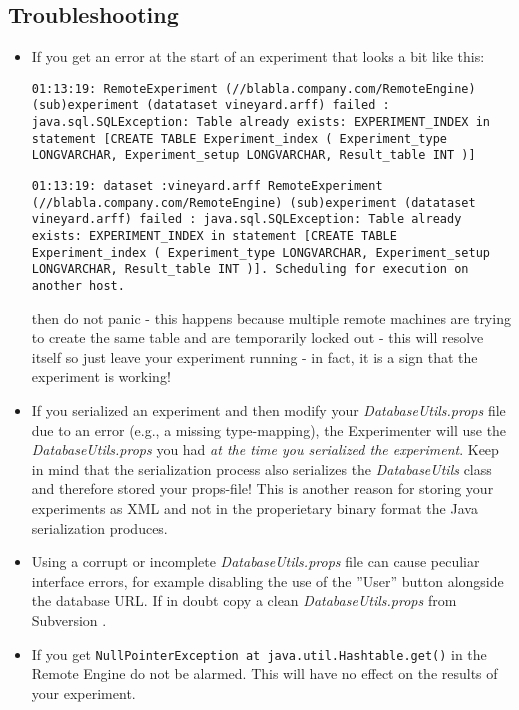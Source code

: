 \subsection{Troubleshooting}

\begin{itemize}
   \item If you get an error at the start of an experiment that looks a bit like this: 

    \texttt{01:13:19: RemoteExperiment (//blabla.company.com/RemoteEngine) (sub)experiment (datataset vineyard.arff) failed : \\ java.sql.SQLException: Table already exists: EXPERIMENT\_INDEX in statement [CREATE TABLE Experiment\_index ( Experiment\_type \\ LONGVARCHAR, Experiment\_setup LONGVARCHAR, Result\_table INT )]} 

    \texttt{01:13:19: dataset :vineyard.arff RemoteExperiment \\ (//blabla.company.com/RemoteEngine) (sub)experiment (datataset vineyard.arff) failed : java.sql.SQLException: Table already exists: EXPERIMENT\_INDEX in statement [CREATE TABLE \\ Experiment\_index ( Experiment\_type LONGVARCHAR, Experiment\_setup LONGVARCHAR, Result\_table INT )]. Scheduling for execution on \\ another host.} 

    then do not panic - this happens because multiple remote machines are trying to create the same table and are temporarily locked out - this will resolve itself so just leave your experiment running - in fact, it is a sign that the experiment is working! 

   \item If you serialized an experiment and then modify your \textit{DatabaseUtils.props} file due to an error (e.g., a missing type-mapping), the Experimenter will use the \textit{DatabaseUtils.props} you had \textit{at the time you serialized the experiment}. Keep in mind that the serialization process also serializes the \textit{DatabaseUtils} class and therefore stored your props-file! This is another reason for storing your experiments as XML and not in the properietary binary format the Java serialization produces. 

   \item Using a corrupt or incomplete \textit{DatabaseUtils.props} file can cause peculiar interface errors, for example disabling the use of the ''User'' button alongside the database URL. If in doubt copy a clean \textit{DatabaseUtils.props} from Subversion \cite{subversion}. 

   \item If you get \texttt{NullPointerException at java.util.Hashtable.get()} in the Remote Engine do not be alarmed. This will have no effect on the results of your experiment. 
\end{itemize}
    
